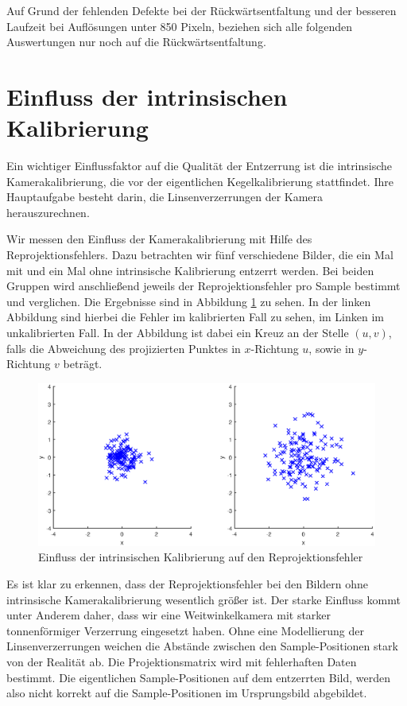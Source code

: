 Auf Grund der fehlenden Defekte bei der Rückwärtsentfaltung und der besseren Laufzeit bei Auflösungen unter 850 Pixeln, beziehen sich alle folgenden Auswertungen nur noch auf die Rückwärtsentfaltung.


\section{Einfluss der intrinsischen Kalibrierung}
Ein wichtiger Einflussfaktor auf die Qualität der Entzerrung ist die intrinsische Kamerakalibrierung, die vor der eigentlichen Kegelkalibrierung stattfindet. Ihre Hauptaufgabe besteht darin, die Linsenverzerrungen der Kamera herauszurechnen.

Wir messen den Einfluss der Kamerakalibrierung mit Hilfe des Reprojektionsfehlers. Dazu betrachten wir fünf verschiedene Bilder, die ein Mal mit und ein Mal ohne intrinsische Kalibrierung entzerrt werden. Bei beiden Gruppen wird anschließend jeweils der Reprojektionsfehler pro Sample bestimmt und verglichen. Die Ergebnisse sind in Abbildung \ref{fig:influenceCalib} zu sehen. In der linken Abbildung sind hierbei die Fehler im kalibrierten Fall zu sehen, im Linken im unkalibrierten Fall. In der Abbildung ist dabei ein Kreuz an der Stelle $(u,v)$, falls die Abweichung des projizierten Punktes in $x$-Richtung $u$, sowie in $y$-Richtung $v$ beträgt.

\begin{figure}[!htb]
	\centering
	\includegraphics[width=\textwidth]{images/reprojectionErrorReverse.eps}
	\caption{Einfluss der intrinsischen Kalibrierung auf den Reprojektionsfehler}
	\label{fig:influenceCalib}
\end{figure}


Es ist klar zu erkennen, dass der Reprojektionsfehler bei den Bildern ohne intrinsische Kamerakalibrierung wesentlich größer ist. Der starke Einfluss kommt unter Anderem daher, dass wir eine Weitwinkelkamera mit starker tonnenförmiger Verzerrung eingesetzt haben. Ohne eine Modellierung der Linsenverzerrungen weichen die Abstände zwischen den Sample-Positionen stark von der Realität ab. Die Projektionsmatrix wird mit fehlerhaften Daten bestimmt. Die eigentlichen Sample-Positionen auf dem entzerrten Bild, werden also nicht korrekt auf die Sample-Positionen im Ursprungsbild abgebildet.

